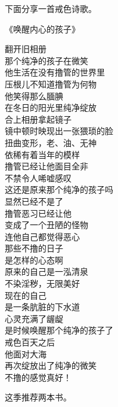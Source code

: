 下面分享一首戒色诗歌。

\begin{center}
    《唤醒内心的孩子》\it
    \begin{multicols}{2}
        翻开旧相册 \\ 那个纯净的孩子在微笑 \\ 他生活在没有撸管的世界里 \\ 压根儿不知道撸管为何物 \\ 他笑得那么腼腆 \\ 在冬日的阳光里纯净绽放 \\ 合上相册拿起镜子 \\ 镜中顿时映现出一张猥琐的脸 \\ 扭曲变形，老、油、无神 \\ 依稀有着当年的模样 \\ 撸管已经让他面目全非 \\ 不禁令人唏嘘感叹 \\ 这还是原来那个纯净的孩子吗 \\ 显然已经不是了 \\ 撸管恶习已经让他 \\ 变成了一个丑陋的怪物 \\ 连他自己都觉得恶心 \\ 那些不撸的日子 \\ 是怎样的心态啊 \\ 原来的自己是一泓清泉 \\ 不染淫秽，无限美好 \\ 现在的自己 \\ 是一条肮脏的下水道 \\ 心灵充满了龌龊 \\ 是时候唤醒那个纯净的孩子了 \\ 戒色百天之后 \\ 他面对大海 \\ 再次绽放出了纯净的微笑 \\ 不撸的感觉真好！
    \end{multicols}
\end{center}

这季推荐两本书。

